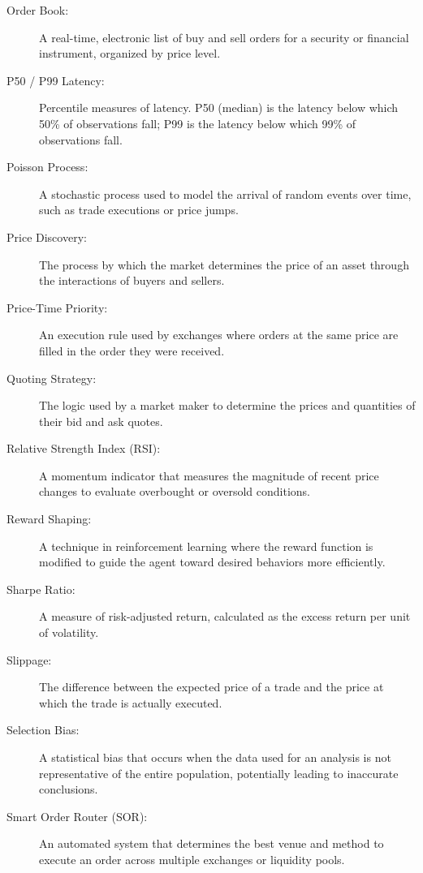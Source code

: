 \begin{description}
    \item[Order Book:] A real-time, electronic list of buy and sell orders for a security or financial instrument, organized by price level.
    
    \item[P50 / P99 Latency:] Percentile measures of latency. P50 (median) is the latency below which 50\% of observations fall; P99 is the latency below which 99\% of observations fall.
    
    \item[Poisson Process:] A stochastic process used to model the arrival of random events over time, such as trade executions or price jumps.

    \item[Price Discovery:] The process by which the market determines the price of an asset through the interactions of buyers and sellers.
    
    \item[Price-Time Priority:] An execution rule used by exchanges where orders at the same price are filled in the order they were received.
    
    \item[Quoting Strategy:] The logic used by a market maker to determine the prices and quantities of their bid and ask quotes.
    
    \item[Relative Strength Index (RSI):] A momentum indicator that measures the magnitude of recent price changes to evaluate overbought or oversold conditions.
    
    \item[Reward Shaping:] A technique in reinforcement learning where the reward function is modified to guide the agent toward desired behaviors more efficiently.
    
    \item[Sharpe Ratio:] A measure of risk-adjusted return, calculated as the excess return per unit of volatility.
    
    \item[Slippage:] The difference between the expected price of a trade and the price at which the trade is actually executed.

    \item[Selection Bias:] A statistical bias that occurs when the data used for an analysis is not representative of the entire population, potentially leading to inaccurate conclusions.

    \item[Smart Order Router (SOR):] An automated system that determines the best venue and method to execute an order across multiple exchanges or liquidity pools.
    

\end{description}
